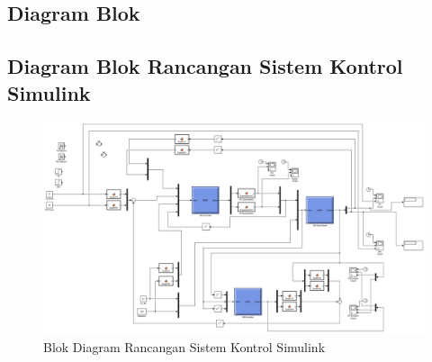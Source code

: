 \begin{landscape}
	\chapter{Diagram Blok}
	\section{Diagram Blok Rancangan Sistem Kontrol Simulink}
	\begin{figure}[!h]
		\centering
		\includegraphics[width=1.2\textwidth]{figures/SimulinkBlockDiagram}
		\caption{Blok Diagram Rancangan Sistem Kontrol Simulink}
		\label{fig:C:SimulinkBlockDiagram}
	\end{figure}
\end{landscape}